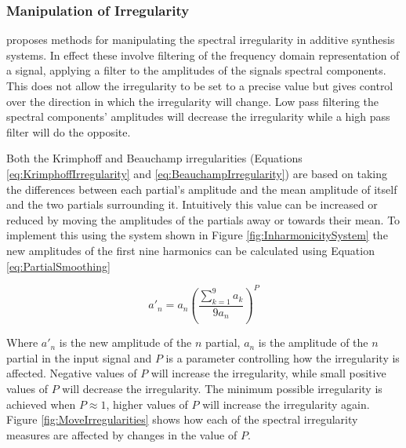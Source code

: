 		\subsubsection*{Manipulation of Irregularity}
			\citet{beauchamp2007analysis} proposes methods for manipulating the spectral irregularity in
			additive synthesis systems. In effect these involve filtering of the frequency domain
			representation of a signal, applying a filter to the amplitudes of the signals spectral components.
			This does not allow the irregularity to be set to a precise value but gives control over the
			direction in which the irregularity will change. Low pass filtering the spectral components'
			amplitudes will decrease the irregularity while a high pass filter will do the opposite.
			
			Both the Krimphoff and Beauchamp irregularities (Equations \ref{eq:KrimphoffIrregularity} and
			\ref{eq:BeauchampIrregularity}) are based on taking the differences between each partial's
			amplitude and the mean amplitude of itself and the two partials surrounding it. Intuitively this
			value can be increased or reduced by moving the amplitudes of the partials away or towards their
			mean. To implement this using the system shown in Figure \ref{fig:InharmonicitySystem} the new
			amplitudes of the first nine harmonics can be calculated using Equation \ref{eq:PartialSmoothing}

			\begin{equation}
				a'_{n} = a_{n} \left( \frac{\sum_{k = 1}^{9} a_{k}}{9a_{n}} \right) ^{P}
				\label{eq:PartialSmoothing}
			\end{equation}

			Where $a'_{n}$ is the new amplitude of the $n$ partial, $a_{n}$ is the amplitude of the
			$n$ partial in the input signal and $P$ is a parameter controlling how the irregularity
			is affected. Negative values of $P$ will increase the irregularity, while small positive values of
			$P$ will decrease the irregularity. The minimum possible irregularity is achieved when $P \approx
			1$, higher values of $P$ will increase the irregularity again. Figure \ref{fig:MoveIrregularities}
			shows how each of the spectral irregularity measures are affected by changes in the value of $P$.

